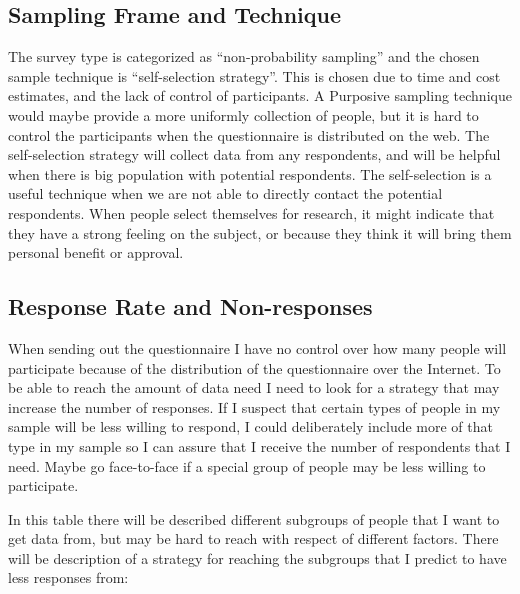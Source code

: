 
  \subsection{Sampling Frame and Technique}

    
    The survey type is categorized as ``non-probability sampling'' and the chosen sample technique is ``self-selection strategy''. This is chosen due to time and cost estimates, and the lack of control of participants. A Purposive sampling technique would maybe provide a more uniformly collection of people, but it is hard to control the participants when the questionnaire is distributed on the web. The self-selection strategy will collect data from any respondents, and will be helpful when there is big population with potential respondents. The self-selection is a useful technique when we are not able to directly contact the potential respondents. When people select themselves for research, it might indicate that they have a strong feeling on the subject, or because they think it will bring them personal benefit or approval. 

  \subsection{Response Rate and Non-responses}

    When sending out the questionnaire I have no control over how many people will participate because of the distribution of the questionnaire over the Internet. To be able to reach the amount of data need I need to look for a strategy that may increase the number of responses. If I suspect that certain types of people in my sample will be less willing to respond, I could deliberately include more of that type in my sample so I can assure that I receive the number of respondents that I need. Maybe go face-to-face if a special group of people may be less willing to participate. 

    In this table there will be described different subgroups of people that I want to get data from, but may be hard to reach with respect of different factors. There will be description of a strategy for reaching the subgroups that I predict to have less responses from:

